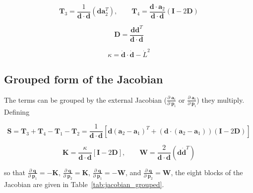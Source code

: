 \documentclass[]{article}
\newcommand{\pd}[2]{\frac{\partial\;#1}{\partial\;#2}}
\begin{document}
\begin{equation*}
    \mathbf{T}_3 = \frac{1}{\mathbf{d} \cdot \mathbf{d}} (\mathbf{d} \mathbf{a}_2^T), \quad\quad \mathbf{T}_4 = \frac{\mathbf{d}\cdot\mathbf{a}_2}{\mathbf{d} \cdot \mathbf{d}} (\mathbf{I} - 2 \mathbf{D})
\end{equation*}

\begin{equation*}
    \mathbf{D} = \frac{\mathbf{d} \mathbf{d}^T}{\mathbf{d} \cdot \mathbf{d}}
\end{equation*}

\begin{equation*}
    \kappa = \dot{\mathbf{d}} \cdot \dot{\mathbf{d}} - \dot{L}^2
\end{equation*}

\subsection{Grouped form of the Jacobian}

The terms can be grouped by the external Jacobian ($\pd{\mathbf{a}_i}{\mathbf{p}_i}$ or $\pd{\mathbf{a}_i}{\dot{\mathbf{p}}_i}$) they multiply.  Defining

\begin{equation*}
    \mathbf{S} = \mathbf{T}_3 + \mathbf{T}_4 - \mathbf{T}_1 - \mathbf{T}_2
    = \frac{1}{\mathbf{d} \cdot \mathbf{d}} \left[ \mathbf{d} (\mathbf{a}_2 - \mathbf{a}_1)^T + \left(\mathbf{d} \cdot (\mathbf{a}_2 - \mathbf{a}_1)\right) (\mathbf{I} - 2\mathbf{D}) \right]
\end{equation*}

\begin{equation*}
    \mathbf{K} = \frac{\kappa}{\mathbf{d} \cdot \mathbf{d}} \left[ \mathbf{I} - 2\mathbf{D} \right], \quad\quad
    \mathbf{W} = \frac{2}{\mathbf{d} \cdot \mathbf{d}} (\mathbf{d} \dot{\mathbf{d}}^T)
\end{equation*}

so that $\pd{\mathbf{q}}{\mathbf{p}_1} = -\mathbf{K}$, $\pd{\mathbf{q}}{\mathbf{p}_2} = \mathbf{K}$, $\pd{\mathbf{q}}{\dot{\mathbf{p}}_1} = -\mathbf{W}$, and $\pd{\mathbf{q}}{\dot{\mathbf{p}}_2} = \mathbf{W}$, the eight blocks of the Jacobian are given in Table~\ref{tab:jacobian_grouped}.
\end{document}
